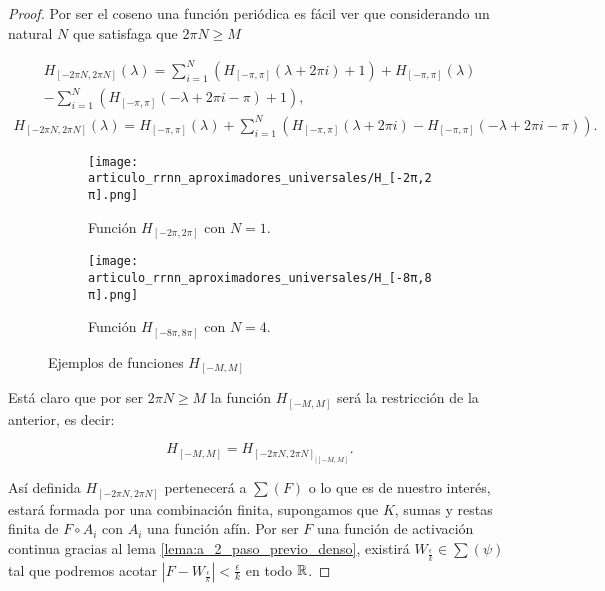 \begin{proof}
    Por ser el coseno una función periódica es fácil ver que 
    considerando un natural $N$ que satisfaga que $2 \pi N \geq M$
  
    \begin{equation}
    \begin{split}
        H_{[-2\pi N, 2 \pi N]} (\lambda) = 
        \sum_{i=1}^N (H_{[-\pi, \pi ]}(\lambda + 2 \pi i) +1) 
        + H_{[-\pi, \pi ]}(\lambda)  \\
        - \sum_{i=1}^N (H_{[-\pi, \pi ]}(- \lambda + 2 \pi i - \pi) +1),
    \end{split}
\end{equation}
\begin{equation}
    \begin{split}
        H_{[-2\pi N, 2 \pi N]} (\lambda) 
        =  H_{[-\pi, \pi ]}(\lambda) + 
        \sum_{i=1}^N (
            H_{[-\pi, \pi ]}(\lambda + 2 \pi i)
            - 
            H_{[-\pi, \pi ]}(- \lambda + 2 \pi i - \pi)
        ) .         
    \end{split}
    \end{equation}

      \begin{figure}[h]
        \centering
        \begin{subfigure}[b]{0.45\textwidth}
            \centering
            \texttt{[image: articulo\_rrnn\_aproximadores\_universales/H\_[-2π,2π].png]}
            \caption{Función $H_{[-2\pi, 2\pi]}$ con $N=1$.}
            \label{fig:H_con_M}
        \end{subfigure}
        \hfill
        \begin{subfigure}[b]{0.45\textwidth}
            \centering
            \texttt{[image: articulo\_rrnn\_aproximadores\_universales/H\_[-8π,8π].png]}
            \caption{Función $H_{[-8\pi, 8\pi]}$ con $N=4$. }
        \end{subfigure}
        \hfill
        \caption{Ejemplos de funciones $H_{[-M, M]}$}
    \end{figure}

    Está claro que por ser $2 \pi N \geq M$ la función $H_{[-M, M]}$ será la restricción de la anterior, es decir: 

    \begin{equation}
        H_{[-M, M]} = H_{[-2\pi N, 2 \pi N]_{|[-M, M]}}.
    \end{equation}

    
    Así definida $H_{[-2\pi N, 2 \pi N]}$
    pertenecerá a $\sum(F)$ o lo que es de nuestro interés, estará 
    formada por una combinación finita, supongamos que $K$, 
    sumas y restas finita de $F \circ A_i$ con $A_i$ una función afín. 
    Por ser $F$ una función de activación continua gracias al
    lema \ref{lema:a_2_paso_previo_denso}, 
    existirá $W_{ \frac{\epsilon}{k}} \in \sum(\psi)$ tal que 
    podremos acotar $|F - W_{ \frac{\epsilon}{k}} | < \frac{\epsilon}{k}$ en todo $\mathbb{R}$.


\end{proof}

